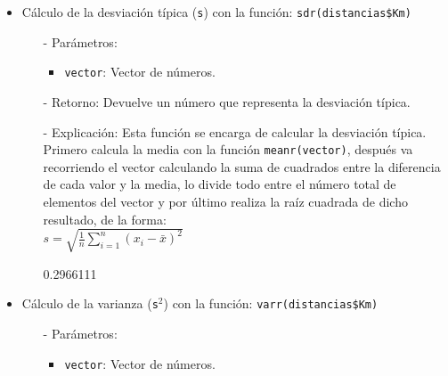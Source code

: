 \documentclass[a4paper, 12pt]{article}
\begin{document}
\begin{itemize}
		\item Cálculo de la desviación típica (\texttt{s}) con la función: \texttt{sdr(distancias\$Km)}
		\begin{itemize}
			\item[-] Parámetros: 
			\begin{itemize}
				\item \texttt{vector}: Vector de números.
			\end{itemize}
			
			\item[-] Retorno: Devuelve un número que representa la desviación típica. 
			
			\item[-] Explicación: Esta función se encarga de calcular la desviación típica. Primero calcula la media con la función \texttt{meanr(vector)}, después va recorriendo el vector calculando la suma de cuadrados entre la diferencia de cada valor y la media, lo divide todo entre el número total de elementos del vector y por último realiza la raíz cuadrada de dicho resultado, de la forma: \\
			$s = \sqrt{\frac{1}{n} \sum_{i=1}^{n} (x_i - \bar{x})^2}$
\begin{Schunk}
\begin{Soutput}
[1] 0.2966111
\end{Soutput}
\end{Schunk}
		\end{itemize}
		
		\item Cálculo de la varianza (\texttt{s$^2$}) con la función: \texttt{varr(distancias\$Km)}
		\begin{itemize}
			\item[-] Parámetros: 
			\begin{itemize}
				\item \texttt{vector}: Vector de números.
			\end{itemize}
			

\end{itemize}
\end{itemize}
\end{document}
